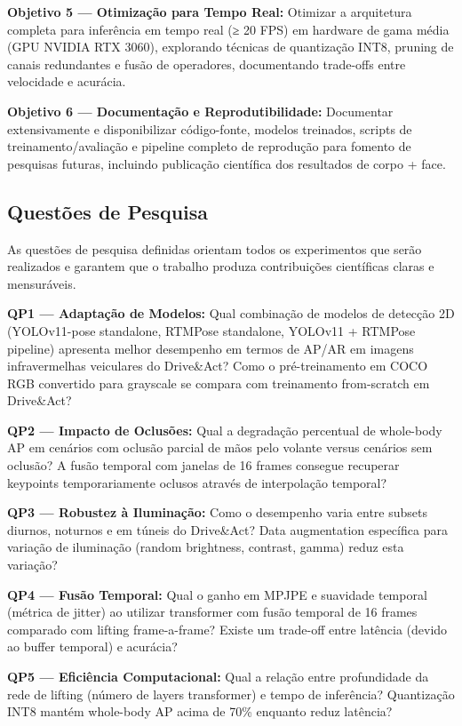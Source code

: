 \documentclass[12pt, a4paper]{article}
\begin{document}
\textbf{Objetivo 5 --- Otimização para Tempo Real:} Otimizar a arquitetura completa para inferência em tempo real (≥ 20 FPS) em hardware de gama média (GPU NVIDIA RTX 3060), explorando técnicas de quantização INT8, pruning de canais redundantes e fusão de operadores, documentando trade-offs entre velocidade e acurácia.

\textbf{Objetivo 6 --- Documentação e Reprodutibilidade:} Documentar extensivamente e disponibilizar código-fonte, modelos treinados, scripts de treinamento/avaliação e pipeline completo de reprodução para fomento de pesquisas futuras, incluindo publicação científica dos resultados de corpo + face.

\subsection{Questões de Pesquisa}

As questões de pesquisa definidas orientam todos os experimentos que serão realizados e garantem que o trabalho produza contribuições científicas claras e mensuráveis.

\textbf{QP1 --- Adaptação de Modelos:} Qual combinação de modelos de detecção 2D (YOLOv11-pose standalone, RTMPose standalone, YOLOv11 + RTMPose pipeline) apresenta melhor desempenho em termos de AP/AR em imagens infravermelhas veiculares do Drive\&Act? Como o pré-treinamento em COCO RGB convertido para grayscale se compara com treinamento from-scratch em Drive\&Act?

\textbf{QP2 --- Impacto de Oclusões:} Qual a degradação percentual de whole-body AP em cenários com oclusão parcial de mãos pelo volante versus cenários sem oclusão? A fusão temporal com janelas de 16 frames consegue recuperar keypoints temporariamente oclusos através de interpolação temporal?

\textbf{QP3 --- Robustez à Iluminação:} Como o desempenho varia entre subsets diurnos, noturnos e em túneis do Drive\&Act? Data augmentation específica para variação de iluminação (random brightness, contrast, gamma) reduz esta variação?

\textbf{QP4 --- Fusão Temporal:} Qual o ganho em MPJPE e suavidade temporal (métrica de jitter) ao utilizar transformer com fusão temporal de 16 frames comparado com lifting frame-a-frame? Existe um trade-off entre latência (devido ao buffer temporal) e acurácia?

\textbf{QP5 --- Eficiência Computacional:} Qual a relação entre profundidade da rede de lifting (número de layers transformer) e tempo de inferência? Quantização INT8 mantém whole-body AP acima de 70\% enquanto reduz latência?
\end{document}
